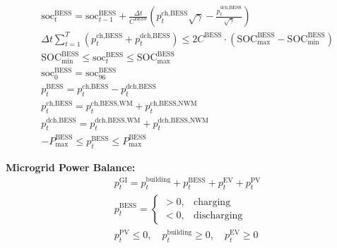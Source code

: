 \documentclass[conference]{IEEEtran}
\begin{document}
{%
\begin{align}
    & \text{soc}_{t}^{\text{BESS}} = \text{soc}_{t-1}^{\text{BESS}} + \frac{\Delta t}{C^{\text{BESS}}} \left( p_{t}^{\text{ch,BESS}} \sqrt{\gamma} - \frac{p_{t}^{\text{dch,BESS}}}{\sqrt{\gamma}} \right) \\
    & \Delta t \sum_{t=1}^{T} \left( p_{t}^{\text{ch,BESS}} + p_{t}^{\text{dch,BESS}} \right) \le 2 C^{\text{BESS}} \cdot (\text{SOC}_{\text{max}}^{\text{BESS}} - \text{SOC}_{\text{min}}^{\text{BESS}}) \\
    & \text{SOC}_{\text{min}}^{\text{BESS}} \le \text{soc}_{t}^{\text{BESS}} \le \text{SOC}_{\text{max}}^{\text{BESS}} \\
    & \text{soc}_{0}^{\text{BESS}} = \text{soc}_{96}^{\text{BESS}} \\
    & p_t^{\text{BESS}} = p_{t}^{\text{ch,BESS}} - p_{t}^{\text{dch,BESS}} \\
    & p_{t}^{\text{ch,BESS}} = p_{t}^{\text{ch,BESS,WM}} + p_{t}^{\text{ch,BESS,NWM}} \\
    & p_{t}^{\text{dch,BESS}} = p_{t}^{\text{dch,BESS,WM}} + p_{t}^{\text{dch,BESS,NWM}} \\
    & -P^{\text{BESS}}_{\text{max}} \leq p^{\text{BESS}}_t \leq P^{\text{BESS}}_{\text{max}} 
\end{align}



\noindent \textbf{Microgrid Power Balance:}
\begin{align}
     &p_{t}^{\text{GI}} = p_{t}^{\text{building}} + p_{t}^{\text{BESS}} + p_{t}^{\text{EV}} + p_{t}^{\text{PV}} \label{eq:MG_power_balance} \\
     &p_{t}^{\text{BESS}} = 
        \begin{cases} 
            > 0, & \text{charging} \\
            < 0, & \text{discharging}
        \end{cases} \\
     &p_{t}^{\text{PV}} \le 0,\quad 
     p_{t}^{\text{building}} \ge 0,\quad 
     p_{t}^{\text{EV}} \ge 0
\end{align}



}
\end{document}
